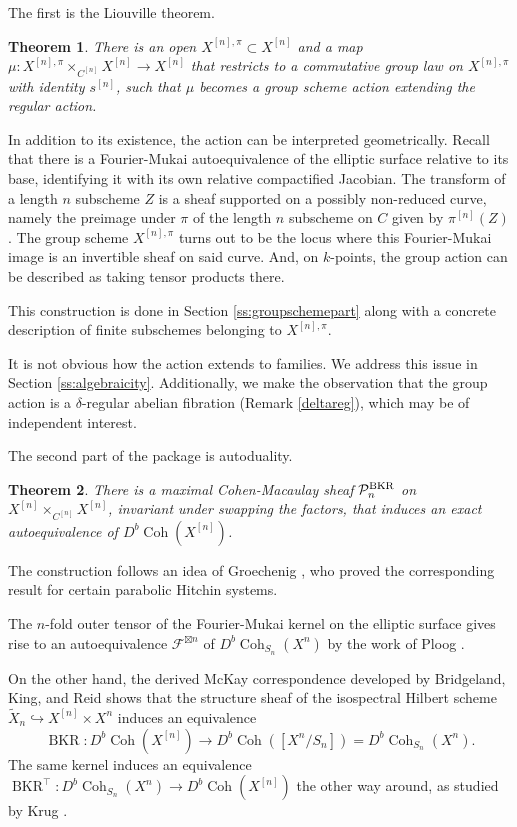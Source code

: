 \documentclass{amsart}
\theoremstyle{plain}
\newtheorem{theorem}{Theorem}[section]
\theoremstyle{definition}
\theoremstyle{remark}
\begin{document}
    The first is the Liouville theorem.
    \begin{theorem}
        There is an open $X^{[n],\pi}\subset X^{[n]}$ and a map $\mu:X^{[n],\pi}\times_{C^{[n]}} X^{[n]}\to X^{[n]}$ that restricts to a commutative group law on $X^{[n],\pi}$ with identity $s^{[n]}$, such that $\mu$ becomes a group scheme action extending the regular action.
    \end{theorem}
    In addition to its existence, the action can be interpreted geometrically.
    Recall that there is a Fourier-Mukai autoequivalence of the elliptic surface relative to its base, identifying it with its own relative compactified Jacobian.
    The transform of a length $n$ subscheme $Z$ is a sheaf supported on a possibly non-reduced curve, namely the preimage under $\pi$ of the length $n$ subscheme on $C$ given by $\pi^{[n]}(Z)$.
    The group scheme $X^{[n],\pi}$ turns out to be the locus where this Fourier-Mukai image is an invertible sheaf on said curve.
    And, on $k$-points, the group action can be described as taking tensor products there.

    This construction is done in Section \ref{ss:groupschemepart} along with a concrete description of finite subschemes belonging to $X^{[n],\pi}$.

    It is not obvious how the action extends to families.
    We address this issue in Section \ref{ss:algebraicity}.
    Additionally, we make the observation that the group action is a $\delta$-regular abelian fibration (Remark \ref{deltareg}), which may be of independent interest.

    The second part of the package is autoduality.
    \begin{theorem}
        There is a maximal Cohen-Macaulay sheaf $\mathcal P_n^{\rm BKR}$ on $X^{[n]}\times_{C^{[n]}}X^{[n]}$, invariant under swapping the factors, that induces an exact autoequivalence of $D^b\operatorname{Coh}(X^{[n]})$.
    \end{theorem}
    The construction follows an idea of Groechenig \cite{groec}, who proved the corresponding result for certain parabolic Hitchin systems.

    The $n$-fold outer tensor of the Fourier-Mukai kernel on the elliptic surface gives rise to an autoequivalence $\mathcal F^{\boxtimes n}$ of $D^b\operatorname{Coh}_{S_n}(X^n)$ by the work of Ploog \cite{ploog}.

    On the other hand, the derived McKay correspondence developed by Bridgeland, King, and Reid \cite{BKR} shows that the structure sheaf of the isospectral Hilbert scheme $\tilde{X}_n\hookrightarrow X^{[n]}\times X^n$ induces an equivalence
    \[\operatorname{BKR}:D^b\operatorname{Coh}(X^{[n]})\to D^b\operatorname{Coh}([X^n/S_n])=D^b\operatorname{Coh}_{S_n}(X^n).\]
    The same kernel induces an equivalence $\operatorname{BKR}^\top:D^b\operatorname{Coh}_{S_n}(X^n)\to D^b\operatorname{Coh}(X^{[n]})$ the other way around, as studied by Krug \cite{krug}.
\end{document}
